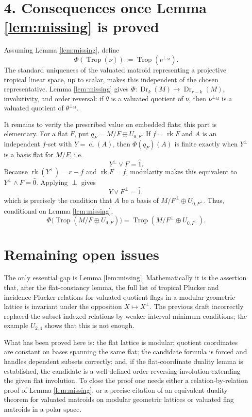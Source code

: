 \documentclass[12pt]{article}
\newcommand{\Dr}{\operatorname{Dr}}
\newcommand{\Trop}{\operatorname{Trop}}
\newcommand{\rk}{\operatorname{rk}}
\newcommand{\cl}{\operatorname{cl}}
\begin{document}
\section*{4. Consequences once Lemma \ref{lem:missing} is proved}

Assuming Lemma \ref{lem:missing}, define
\[
       \Phi(\Trop(\nu)):=\Trop(\nu^{\perp_M}).
\]
The standard uniqueness of the valuated matroid representing a
projective tropical linear space, up to scalar, makes this independent
of the chosen representative.  Lemma \ref{lem:missing} gives
$\Phi:\Dr_k(M)\to\Dr_{r-k}(M)$, involutivity, and order reversal:
if $\theta$ is a valuated quotient of $\nu$, then
$\nu^{\perp_M}$ is a valuated quotient of $\theta^{\perp_M}$.

It remains to verify the prescribed value on embedded flats; this part
is elementary.  For a flat $F$, put
$q_F=M/F\oplus U_{0,F}$.  If $f=\rk F$ and $A$ is an independent
$f$-set with $Y=\cl(A)$, then $\Phi(q_F)(A)$ is finite exactly when
$Y^\perp$ is a basis flat for $M/F$, i.e.
\[
        Y^\perp\vee F=\hat 1 .
\]
Because $\rk(Y^\perp)=r-f$ and $\rk F=f$, modularity makes this
equivalent to $Y^\perp\wedge F=\hat 0$.  Applying $\perp$ gives
\[
        Y\vee F^\perp=\hat 1 ,
\]
which is precisely the condition that $A$ be a basis of
$M/F^\perp\oplus U_{0,F^\perp}$.  Thus, conditional on
Lemma \ref{lem:missing},
\[
        \Phi\bigl(\Trop(M/F\oplus U_{0,F})\bigr)
        =
        \Trop(M/F^\perp\oplus U_{0,F^\perp}).
\]

\section*{Remaining open issues}

The only essential gap is Lemma \ref{lem:missing}.  Mathematically it
is the assertion that, after the flat-constancy lemma, the full list
of tropical Plucker and incidence-Plucker relations for valuated
quotient flags in a modular geometric lattice is invariant under the
opposition $X\mapsto X^\perp$.  The previous draft incorrectly
replaced the subset-indexed relations by weaker interval-minimum
conditions; the example $U_{2,4}$ shows that this is not enough.

What has been proved here is: the flat lattice is modular; quotient
coordinates are constant on bases spanning the same flat; the
candidate formula is forced and handles dependent subsets correctly;
and, if the flat-coordinate duality lemma is established, the
candidate is a well-defined order-reversing involution extending the
given flat involution.  To close the proof one needs either a
relation-by-relation proof of Lemma \ref{lem:missing}, or a precise
citation of an equivalent duality theorem for valuated matroids on
modular geometric lattices or valuated flag matroids in a polar space.
\end{document}
